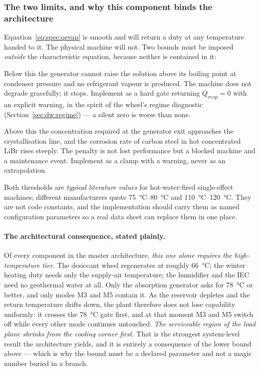 \subsubsection{The two limits, and why this component binds the architecture}
Equation~\eqref{eq:spec:qevap} is smooth and will return a duty at any temperature handed to it. The
physical machine will not. Two bounds must be imposed \emph{outside} the characteristic equation,
because neither is contained in it:
\begin{description}[leftmargin=1.6em,nosep]
\item[Lower bound, $T_{\mathrm{gen}}\gtrsim\SI{78}{\celsius}$.] Below this the generator cannot raise
the solution above its boiling point at condenser pressure and no refrigerant vapour is produced. The
machine does not degrade gracefully; it stops. Implement as a hard gate returning
$Q_{\mathrm{evap}}=0$ with an explicit warning, in the spirit of the wheel's regime diagnostic
(Section~\ref{sec:dw:regime}) --- a silent zero is worse than none.
\item[Upper bound, $T_{\mathrm{gen}}\lesssim\SI{110}{\celsius}$.] Above this the concentration
required at the generator exit approaches the crystallisation line, and the corrosion rate of carbon
steel in hot concentrated LiBr rises steeply. The penalty is not lost performance but a blocked
machine and a maintenance event. Implement as a clamp with a warning, never as an extrapolation.
\end{description}
Both thresholds are \emph{typical literature values} for hot-water-fired single-effect machines;
different manufacturers quote \SIrange{75}{80}{\celsius} and \SIrange{110}{120}{\celsius}. They are
not code constants, and the implementation should carry them as named configuration parameters so a
real data sheet can replace them in one place.

\paragraph{The architectural consequence, stated plainly.} Of every component in the master
architecture, \emph{this one alone requires the high-temperature tier}. The desiccant wheel
regenerates at roughly \SI{66}{\celsius}; the winter heating duty needs only the supply-air
temperature; the humidifier and the IEC need no geothermal water at all. Only the absorption
generator asks for \SI{78}{\celsius} or better, and only modes M3 and M5 contain it. As the reservoir
depletes and the return temperature drifts down, the plant therefore does not lose capability
uniformly: it crosses the \SI{78}{\celsius} gate first, and at that moment M3 and M5 switch off while
every other mode continues untouched. \emph{The serviceable region of the load plane shrinks from the
cooling corner first.} That is the strongest system-level result the architecture yields, and it is
entirely a consequence of the lower bound above --- which is why the bound must be a declared
parameter and not a magic number buried in a branch.

